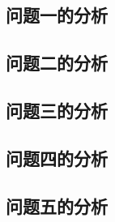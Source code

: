 \documentclass[../main.tex]{subfiles}
\begin{document}
  \subsection{问题一的分析}
    \subsection{问题二的分析}
    \subsection{问题三的分析}
    \subsection{问题四的分析}
    \subsection{问题五的分析}  
\end{document}
